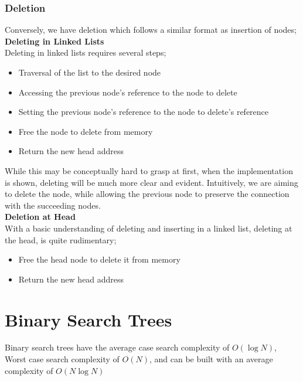 \documentclass[hidelinks,11pt]{article}
\begin{document}
\subsubsection{Deletion}
Conversely, we have deletion which follows a similar format as insertion of nodes;\\[0.5\baselineskip]
\textbf{Deleting in Linked Lists}\\
Deleting in linked lists requires several steps;
\begin{itemize}
    \item Traversal of the list to the desired node
    \item Accessing the previous node's reference to the node to delete
    \item Setting the previous node's reference to the node to delete's reference 
    \item Free the node to delete from memory
    \item Return the new head address
\end{itemize}
While this may be conceptually hard to grasp at first, when the implementation is shown, deleting will be much more clear and evident. Intuitively, we are aiming to delete the node, while allowing the previous node to preserve the connection with the succeeding nodes.\\[0.5\baselineskip]
\textbf{Deletion at Head}\\
With a basic understanding of deleting and inserting in a linked list, deleting at the head, is quite rudimentary;
\begin{itemize}
    \item Free the head node to delete it from memory
    \item Return the new head address
\end{itemize}
\section{Binary Search Trees}
Binary search trees have the average case search complexity of $O(\log N)$, Worst case search complexity of $O(N)$, and can be built with an average complexity of $O(N \log N)$
\end{document}
